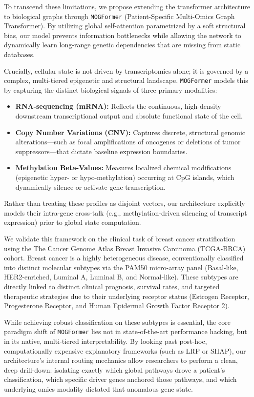\documentclass[10pt, twocolumn]{article}
\begin{document}
To transcend these limitations, we propose extending the transformer architecture to biological graphs through \texttt{MOGFormer} (Patient-Specific Multi-Omics Graph Transformer). By utilizing global self-attention parametrized by a soft structural bias, our model prevents information bottlenecks while allowing the network to dynamically learn long-range genetic dependencies that are missing from static databases. 

Crucially, cellular state is not driven by transcriptomics alone; it is governed by a complex, multi-tiered epigenetic and structural landscape. \texttt{MOGFormer} models this by capturing the distinct biological signals of three primary modalities:
\begin{itemize}
    \item \textbf{RNA-sequencing (mRNA):} Reflects the continuous, high-density downstream transcriptional output and absolute functional state of the cell.
    \item \textbf{Copy Number Variations (CNV):} Captures discrete, structural genomic alterations—such as focal amplifications of oncogenes or deletions of tumor suppressors—that dictate baseline expression boundaries.
    \item \textbf{Methylation Beta-Values:} Measures localized chemical modifications (epigenetic hyper- or hypo-methylation) occurring at CpG islands, which dynamically silence or activate gene transcription.
\end{itemize}
Rather than treating these profiles as disjoint vectors, our architecture explicitly models their intra-gene cross-talk (e.g., methylation-driven silencing of transcript expression) prior to global state computation.

We validate this framework on the clinical task of breast cancer stratification using the The Cancer Genome Atlas Breast Invasive Carcinoma (TCGA-BRCA) cohort. Breast cancer is a highly heterogeneous disease, conventionally classified into distinct molecular subtypes via the PAM50 micro-array panel (Basal-like, HER2-enriched, Luminal A, Luminal B, and Normal-like). These subtypes are directly linked to distinct clinical prognosis, survival rates, and targeted therapeutic strategies due to their underlying receptor status (Estrogen Receptor, Progesterone Receptor, and Human Epidermal Growth Factor Receptor 2). 

While achieving robust classification on these subtypes is essential, the core paradigm shift of \texttt{MOGFormer} lies not in state-of-the-art performance hacking, but in its native, multi-tiered interpretability. By looking past post-hoc, computationally expensive explanatory frameworks (such as LRP or SHAP), our architecture’s internal routing mechanics allow researchers to perform a clean, deep drill-down: isolating exactly which global pathways drove a patient's classification, which specific driver genes anchored those pathways, and which underlying omics modality dictated that anomalous gene state.
\end{document}
